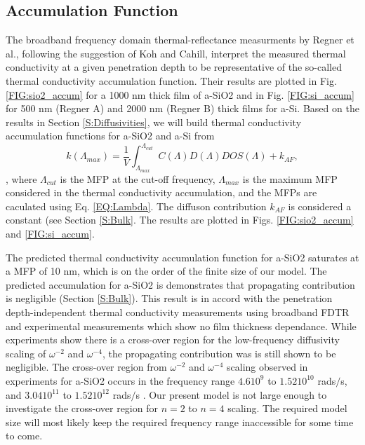\documentclass[aps,prb,onecolumn,preprint,superscriptaddress,footinbib,amsmath,amssymb,floatfix]{revtex4}
\begin{document}
\subsection{\label{S:Accumulation}Accumulation Function}

The broadband frequency domain thermal-reflectance 
measurments by Regner et al.,\cite{regner_broadband_2013}  
following the suggestion of Koh and Cahill,\cite{koh_frequency_2007} 
interpret the  
measured thermal conductivity at a given penetration depth 
to be representative of the so-called thermal conductivity accumulation 
function. Their results are plotted in Fig. \ref{FIG:sio2_accum} 
for a 1000 nm thick film of a-SiO2 
and in Fig. \ref{FIG:si_accum} for 500 nm (Regner A) and 
2000 nm (Regner B) thick films for a-Si.\cite{regner_broadband_2013} 
Based on the results in Section \ref{S:Diffusivities}, we will build 
thermal conductivity accumulation functions for a-SiO2 and a-Si from
\begin{equation}\label{EQ:kLambda}
k(\Lambda_{max}) = \frac{1}{V}\int^{\Lambda_{cut}}_{\Lambda_{max}} 
C(\Lambda) D(\Lambda)DOS(\Lambda)    
+k_{AF},
\end{equation},
where $\Lambda_{cut}$ is the MFP at the cut-off frequency, 
$\Lambda_{max}$ is the maximum MFP considered in the thermal 
conductivity accumulation, and the MFPs are 
caculated using Eq. \eqref{EQ:Lambda}. The 
diffuson contribution $k_{AF}$ is considered a constant 
(see Section \ref{S:Bulk}. The results are plotted 
in Figs. \ref{FIG:sio2_accum} and \ref{FIG:si_accum}. 

The predicted thermal conductivity accumulation function for a-SiO2 
saturates 
at a MFP of 10 nm, which is on the order of the finite size 
of our model. 
The predicted accumulation for a-SiO2 is 
demonstrates that 
propagating contribution is negligible (Section \ref{S:Bulk}). 
This result is in accord 
with the penetration depth-independent thermal 
conductivity measurements using broadband FDTR
\cite{regner_broadband_2013} and experimental measurements 
which show no film thickness dependance.
\cite{lee_heat_1997,yamane_measurement_2002}
While experiments show there is a cross-over region for the 
low-frequency diffusivity scaling of $\omega^{-2}$ and 
$\omega^{-4}$,
\cite{masciovecchio_evidence_2006,baldi_emergence_2013} 
the propagating contribution was is still shown to be negligible.
\cite{love_estimate_1990}
The cross-over region from $\omega^{-2}$ and 
$\omega^{-4}$ scaling observed in experiments for  
a-SiO2 occurs in the frequency range $4.6 10^9$ to 
$1.52 10^{10}$ rads$/$s,\cite{masciovecchio_evidence_2006} 
and $3.04 10^11$ to $1.52 10^{12}$ rads$/$s
\cite{baldi_emergence_2013}. 
Our present model is not 
large enough to investigate the cross-over region for $n=2$ to 
$n=4$ scaling. The required model size will most likely 
keep the required frequency range inaccessible for some 
time to come. 
\end{document}
